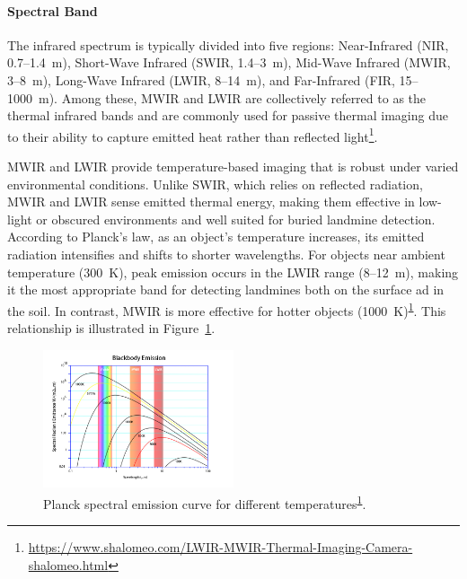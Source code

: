 \paragraph{Spectral Band}

The infrared spectrum is typically divided into five regions: Near-Infrared (NIR, 0.7--1.4~\textmu m), Short-Wave Infrared (SWIR, 1.4–3~\textmu m), Mid-Wave Infrared (MWIR, 3–8~\textmu m), Long-Wave Infrared (\gls{LWIR}, 8–14~\textmu m), and Far-Infrared (FIR, 15–1000~\textmu m). Among these, \gls{MWIR} and \gls{LWIR} are collectively referred to as the thermal infrared bands and are commonly used for passive thermal imaging due to their ability to capture emitted heat rather than reflected light\footnote{\label{LWIR}\url{https://www.shalomeo.com/LWIR-MWIR-Thermal-Imaging-Camera-shalomeo.html}}.

\gls{MWIR} and \gls{LWIR} provide temperature-based imaging that is robust under varied environmental conditions. Unlike \gls{SWIR}, which relies on reflected radiation, \gls{MWIR} and \gls{LWIR} sense emitted thermal energy, making them effective in low-light or obscured environments and well suited for buried landmine detection. According to Planck’s law, as an object’s temperature increases, its emitted radiation intensifies and shifts to shorter wavelengths. For objects near ambient temperature (300~K), peak emission occurs in the \gls{LWIR} range (8–12~\textmu m), making it the most appropriate band for detecting landmines both on the surface ad in the soil. In contrast, \gls{MWIR} is more effective for hotter objects (1000~K)\textsuperscript{\ref{LWIR}}. This relationship is illustrated in Figure~\ref{fig:wien_law}.

\begin{figure}[H]
    \centering
    \includegraphics[width=0.5\textwidth]{figs/Huirui/wien_law_plot.png}
    \caption[Planck spectral emission curve]{Planck spectral emission curve for different temperatures\textsuperscript{\ref{LWIR}}.}
    \label{fig:wien_law}
\end{figure}


